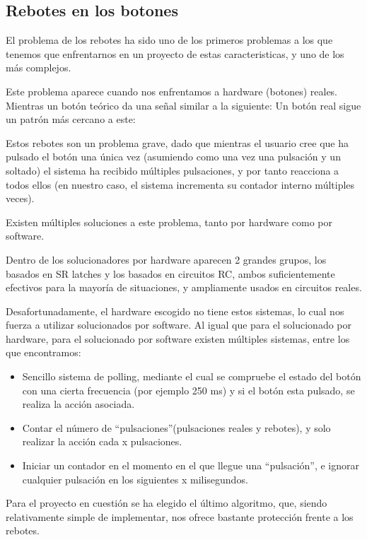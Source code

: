 \documentclass[12pt,letterpaper]{article}
\begin{document}
\subsection{Rebotes en los botones}
\label{subsec:rebound}
El problema de los rebotes ha sido uno de los primeros problemas a los
que tenemos que enfrentarnos en un proyecto de estas caracteristicas,
y uno de los más complejos.

Este problema aparece cuando nos enfrentamos a hardware (botones)
reales. Mientras un botón teórico da una señal similar a la siguiente:
Un botón real sigue un patrón más cercano a este:

Estos rebotes son un problema grave, dado que mientras el usuario cree
que ha pulsado el botón una única vez (asumiendo como una vez una
pulsación y un soltado) el sistema ha recibido múltiples pulsaciones,
y por tanto reacciona a todos ellos (en nuestro caso, el sistema
incrementa su contador interno múltiples veces).

Existen múltiples soluciones a este problema, tanto por hardware como
por software.

Dentro de los solucionadores por hardware aparecen 2 grandes grupos,
los basados en SR latches y los basados en circuitos RC, ambos
suficientemente efectivos para la mayoría de situaciones, y
ampliamente usados en circuitos reales.

Desafortunadamente, el hardware escogido no tiene estos sistemas, lo
cual nos fuerza a utilizar solucionados por software. Al igual que
para el solucionado por hardware, para el solucionado por software
existen múltiples sistemas, entre los que encontramos:
\begin{itemize}
  \item Sencillo sistema de polling, mediante el cual se compruebe el
    estado del botón con una cierta frecuencia (por ejemplo 250 ms) y
    si el botón esta pulsado, se realiza la acción asociada.
  \item Contar el número de ``pulsaciones''(pulsaciones reales y
    rebotes), y solo realizar la acción cada x pulsaciones.
  \item Iniciar un contador en el momento en el que llegue una
    ``pulsación'', e ignorar cualquier pulsación en los siguientes x
    milisegundos.
\end{itemize}

Para el proyecto en cuestión se ha elegido el último algoritmo, que,
siendo relativamente simple de implementar, nos ofrece bastante
protección frente a los rebotes.
\end{document}
